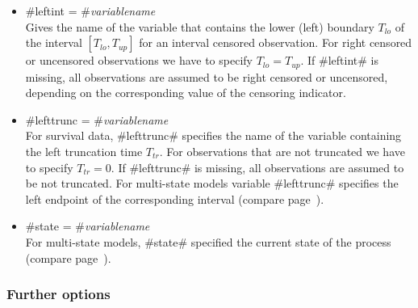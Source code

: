 \begin{itemize}
\item #leftint = #{\em variablename}\\
Gives the name of the variable that contains the lower (left)
boundary $T_{lo}$ of the interval $[T_{lo},T_{up}]$ for an interval
censored observation. For right censored or uncensored observations
we have to specify $T_{lo}=T_{up}$. If #leftint# is missing, all
observations are assumed to be right censored or uncensored,
depending on the corresponding value of the censoring indicator.

\item #lefttrunc = #{\em variablename}\\
For survival data, #lefttrunc# specifies the name of the variable
containing the left truncation time $T_{tr}$. For observations that
are not truncated we have to specify $T_{tr}=0$. If #lefttrunc# is
missing, all observations are assumed to be not truncated. For
multi-state models variable #lefttrunc# specifies the left endpoint
of the corresponding interval (compare page~\pageref{msm_code}).

\item #state = #{\em variablename}\\
For multi-state models, #state# specified the current state of the
process (compare page~\pageref{msm_code}).
\end{itemize}

\subsubsection*{Further options} \label{remlreg_further_options}

